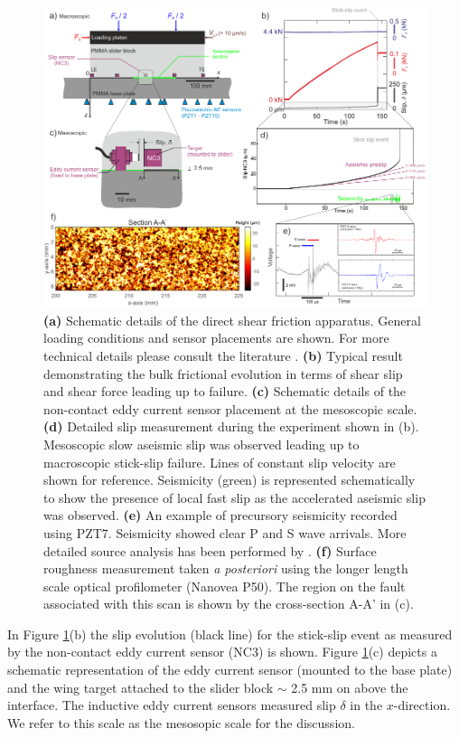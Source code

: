 \documentclass[final,3p, 11pt,authoryear]{elsarticle}
\begin{document}
\begin{figure}[h]
 	\centering
 	\includegraphics{FIG1.pdf} 
 	\caption{ \textbf{(a)} Schematic details of the direct shear friction apparatus. General loading conditions and sensor placements are shown. For more technical details please consult the literature \citep{Selvadurai2015, Selvadurai2015a}. \textbf{(b)} Typical result demonstrating the bulk frictional evolution in terms of shear slip and shear force leading up to failure. \textbf{(c)} Schematic details of the non-contact eddy current sensor placement at the mesoscopic scale. \textbf{(d)} Detailed slip measurement during the experiment shown in (b).  Mesoscopic slow aseismic slip was observed leading up to macroscopic stick-slip failure.  Lines of constant slip velocity are shown for reference.  Seismicity (green) is represented schematically to show the presence of local fast slip as the accelerated aseismic slip was observed. \textbf{(e)}  An example of precursory seismicity recorded using PZT7.  Seismicity showed clear P and S wave arrivals. More detailed source analysis has been performed by \citet{Selvadurai2019}. \textbf{(f)} Surface roughness measurement taken \textit{a posteriori} using the longer length scale optical profilometer (Nanovea P50).  The region on the fault associated with this scan is shown by the cross-section A-A’ in (c).}
 	\label{fig1}
 \end{figure}
 In Figure \ref{fig1}(b) the slip evolution (black line) for the stick-slip event as measured by the non-contact eddy current sensor (NC3) is shown.  Figure \ref{fig1}(c) depicts a schematic representation of the eddy current sensor (mounted to the base plate) and the wing target attached to the slider block $\sim$ 2.5 mm on above the interface.  The inductive eddy current sensors measured slip $\delta$ in the $x$-direction. We refer to this scale as the mesosopic scale for the discussion.   
 
\end{document}

